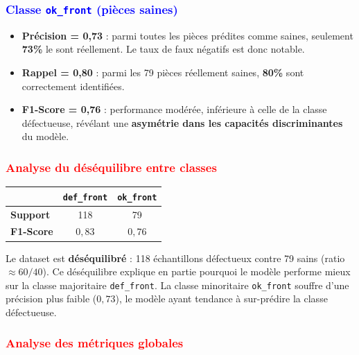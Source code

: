 \textcolor{blue}{\subsubsection*{Classe \texttt{ok\_front} (pièces saines)}}

\begin{itemize}
    \item \textbf{Précision = 0,73} : parmi toutes les pièces prédites comme 
    saines, seulement \textbf{73\%} le sont réellement. Le taux de faux 
    négatifs est donc notable.
    
    \item \textbf{Rappel = 0,80} : parmi les 79 pièces réellement saines, 
    \textbf{80\%} sont correctement identifiées.
    
    \item \textbf{F1-Score = 0,76} : performance modérée, inférieure à celle 
    de la classe défectueuse, révélant une \textbf{asymétrie dans les capacités 
    discriminantes} du modèle.
\end{itemize}

\textcolor{red}{\subsubsection*{Analyse du déséquilibre entre classes}}

\begin{table}[H]
\centering
\renewcommand{\arraystretch}{1.3}
\begin{tabular}{|l|c|c|}
\hline
                   & \texttt{def\_front} & \texttt{ok\_front} \\
\hline
\textbf{Support}   & 118                 & 79                 \\
\hline
\textbf{F1-Score}  & $0{,}83$            & $0{,}76$           \\
\hline
\end{tabular}
\end{table}

Le dataset est \textbf{déséquilibré} : 118 échantillons défectueux contre 
79 sains (ratio $\approx 60/40$). Ce déséquilibre explique en partie pourquoi 
le modèle performe mieux sur la classe majoritaire \texttt{def\_front}. 
La classe minoritaire \texttt{ok\_front} souffre d'une précision plus faible 
($0{,}73$), le modèle ayant tendance à sur-prédire la classe défectueuse.

\textcolor{red}{\subsubsection*{Analyse des métriques globales}}

